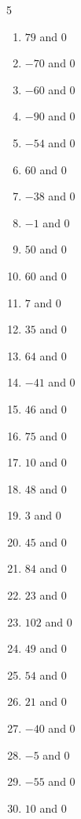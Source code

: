 \begin{multicols}{5}\raggedright
\begin{enumerate}[label=\arabic*., leftmargin=*, itemsep=1pt]
\item $79$ and $0$
\item $-70$ and $0$
\item $-60$ and $0$
\item $-90$ and $0$
\item $-54$ and $0$
\item $60$ and $0$
\item $-38$ and $0$
\item $-1$ and $0$
\item $50$ and $0$
\item $60$ and $0$
\item $7$ and $0$
\item $35$ and $0$
\item $64$ and $0$
\item $-41$ and $0$
\item $46$ and $0$
\item $75$ and $0$
\item $10$ and $0$
\item $48$ and $0$
\item $3$ and $0$
\item $45$ and $0$
\item $84$ and $0$
\item $23$ and $0$
\item $102$ and $0$
\item $49$ and $0$
\item $54$ and $0$
\item $21$ and $0$
\item $-40$ and $0$
\item $-5$ and $0$
\item $-55$ and $0$
\item $10$ and $0$
\end{enumerate}
\end{multicols}
